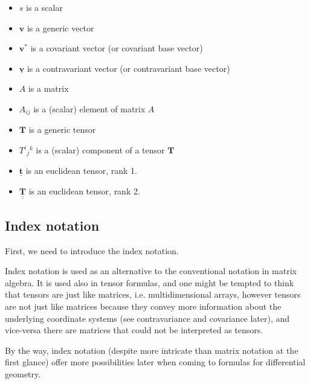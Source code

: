 \documentclass{digitaldynamics}
\def\vect#1{\bm{#1}}
\def\vcovar#1{{\bm{#1}}^*}
\def\vcontr#1{\underline{\bm{#1}}}
\def\tensor#1{\bm{#1}}
\def\etensor#1{\underline{\bm{#1}}}
\def\eetensor#1{\underline{\underline{\bm{#1}}}}
\def\matr#1{{#1}}
\begin{document}
\begin{itemize}
 \item $s$ is a scalar
 \item $\vect{v}$ is a generic vector 
 \item $\vcovar{v}$ is a covariant vector (or covariant base vector)
 \item $\vcontr{v}$ is a contravariant vector (or contravariant base vector)
 \item $\matr{A}$ is a matrix
 \item $A_{ij}$ is a (scalar) element of matrix $\matr{A}$
 \item $\tensor{T}$ is a generic tensor
 \item $T^i{}_j{}^k$ is a (scalar) component of a tensor $\tensor{T}$
 \item $\etensor{t}$ is an euclidean tensor, rank 1.
 \item $\eetensor{T}$ is an euclidean tensor, rank 2.
\end{itemize}

\subsection{Index notation}


First, we need to introduce the index notation. 

Index notation is used as an alternative to the conventional notation in matrix algebra.
It is used also in tensor formulas, and one might be tempted to think that tensors are just like matrices, i.e. multidimensional
arrays, however tensors are not just like matrices because they convey more information about the underlying coordinate
systems (see contravariance and covariance later), and vice-versa there are matrices that could not be interpreted as tensors. 

By the way, index notation (despite more intricate than matrix notation at the first glance) offer more possibilities later when coming to 
formulas for differential geometry.
	
\end{document}
